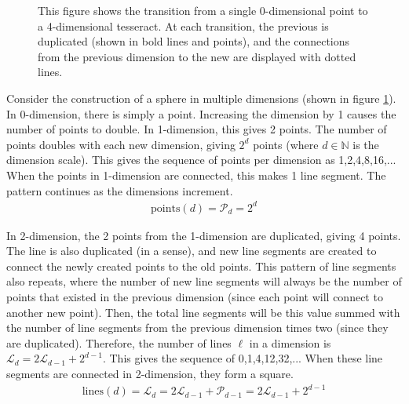 \begin{figure}[h]
\begin{center}
\end{center}
	\caption{This figure shows the transition from a single 0-dimensional point to a 4-dimensional tesseract. At each transition, the previous is duplicated (shown in bold lines and points), and the connections from the previous dimension to the new are displayed with dotted lines.}
	\label{fig:cubes-increasing-dimensions}
\end{figure}




Consider the construction of a sphere in multiple dimensions (shown in figure \ref{fig:cubes-increasing-dimensions}). In 0-dimension, there is simply a point. Increasing the dimension by 1 causes the number of points to double. In 1-dimension, this gives 2 points. The number of points doubles with each new dimension, giving $2^d$ points (where $d\in\mathbb{N}$ is the dimension scale). This gives the sequence of points per dimension as 1,2,4,8,16,... When the points in 1-dimension are connected, this makes 1 line segment. The pattern continues as the dimensions increment. 
\begin{align}
	\text{points}(d) = \mathcal{P}_d = 2^d
\end{align}

In 2-dimension, the 2 points from the 1-dimension are duplicated, giving 4 points. The line is also duplicated (in a sense), and new line segments are created to connect the newly created points to the old points. This pattern of line segments also repeats, where the number of new line segments will always be the number of points that existed in the previous dimension (since each point will connect to another new point). Then, the total line segments will be this value summed with the number of line segments from the previous dimension times two (since they are duplicated). Therefore, the number of lines $\ell$ in a dimension is $\mathcal{L}_d = 2\mathcal{L}_{d-1}+2^{d-1}$. This gives the sequence of 0,1,4,12,32,... When these line segments are connected in 2-dimension, they form a square.
\begin{align}
	\text{lines}(d) = \mathcal{L}_d = 2\mathcal{L}_{d-1}+\mathcal{P}_{d-1} = 2\mathcal{L}_{d-1}+2^{d-1}
\end{align}

